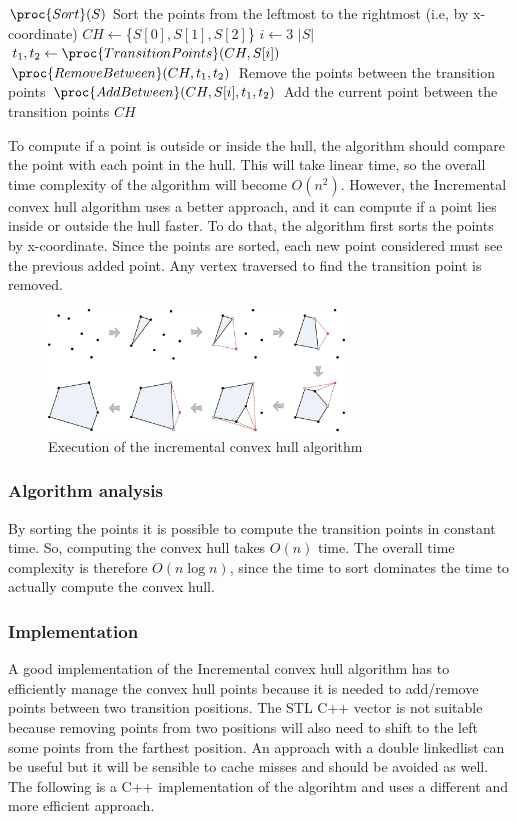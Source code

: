 \documentclass{article}
\begin{document}
\begin{codebox}
\li $\proc{Sort}(S)$ \Comment Sort the points from the leftmost to the rightmost (i.e, by x-coordinate)
\li $CH \gets $\{$S[0], S[1], S[2]$\}
\li \For $i \gets 3$ \To $|S|$
    \Do
\li     $t_{1}, t_{2} \gets \proc{TransitionPoints}(CH, S[i])$
\li     $\proc{RemoveBetween}(CH, t_{1}, t_{2})$ \Comment Remove the points between the transition points
\li     $\proc{AddBetween}(CH, S[i], t_{1}, t_{2})$ \Comment Add the current point between the transition points
    \End
\li \Return $CH$
\end{codebox}

To compute if a point is outside or inside the hull, the algorithm should compare the point with each point in the hull. This will take linear time, so the overall time complexity of the algorithm will become $O(n^2)$. However, the Incremental convex hull algorithm uses a better approach, and it can compute if a point lies inside or outside the hull faster. To do that, the algorithm first sorts the points by x-coordinate. Since the points are sorted, each new point considered must see the previous added point. Any vertex traversed to find the transition point is removed.

\begin{figure}[h]
\centering
\includegraphics[width=0.7\textwidth]{incremental/incremental_visual.png}
\caption{\label{fig:incremental_visual}Execution of the incremental convex hull algorithm}
\end{figure}

\subsubsection*{Algorithm analysis}
By sorting the points it is possible to compute the transition points in constant time. So, computing the convex hull takes $O(n)$ time. The overall time complexity is therefore $O(n\log{n})$, since the time to sort dominates the time to actually compute the convex hull.

\subsubsection*{Implementation}
A good implementation of the Incremental convex hull algorithm has to efficiently manage the convex hull points because it is needed to add/remove points between two transition positions. The STL C++ vector is not suitable because removing points from two positions will also need to shift to the left some points from the farthest position. An approach with a double linkedlist can be useful but it will be sensible to cache misses and should be avoided as well. The following is a C++ implementation of the algorihtm and uses a different and more efficient approach.
\end{document}
